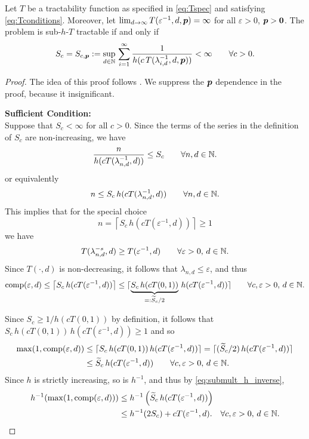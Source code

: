 \documentclass[11pt,a4paper]{article}
\begin{document}
\begin{theorem}\label{thm:subhT}
	Let $T$ be a tractability function as specified in \eqref{eq:Tspec} and satisfying \eqref{eq:Tconditions}.  Moreover, let $\lim_{d \to \infty} T(\varepsilon^{-1},d,\boldsymbol{p}) = \infty$ for all $\varepsilon > 0$, $\boldsymbol{p} > \boldsymbol{0}$.  The problem is sub-$h$-$T$ tractable if and only if
	\[
	S_c = S_{c,\boldsymbol{p}} :=\sup_{d\in\mathbb{N}}  \, \sum_{i=1}^\infty \frac1{h(c\, T(\lambda_{i,d}^{-1},d,\boldsymbol{p}))} <\infty \qquad \forall c > 0.
	\]
\end{theorem}
\begin{proof}
The idea of this proof follows \cite{WW17}.
We suppress the $\boldsymbol{p}$ dependence in the proof, because it insignificant.

\bigskip

\noindent \textbf{Sufficient Condition:}\\
Suppose that $S_c <\infty$ for all $c>0$.  Since the terms of the series in the definition of $S_c$ are non-increasing, we have
	\[
		\frac{n}{h(cT(\lambda_{n,d}^{-1},d))}\le S_c \qquad \forall n,d \in \mathbb{N}.
	\]
or equivalently
\[
	n\le S_c \, h(cT(\lambda_{n,d}^{-1},d))   \qquad \forall n,d \in \mathbb{N}.
\]
This implies that for the special choice
\[
	n = \left\lceil
	S_c \, h(cT(\varepsilon^{-1},d))
	\right\rceil \ge 1
\]
	we have
	\[
	T(\lambda_{n,d}^{-s},d) \ge T(\varepsilon^{-1},d) \qquad \forall \varepsilon > 0, \, d \in \mathbb{N}.
	\]
Since $T(\cdot,d)$ is non-decreasing, it follows that $\lambda_{n,d} \le \varepsilon$, and thus
\[
\operatorname{comp}(\varepsilon,d) \le  \left\lceil
S_c \, h(cT(\varepsilon^{-1},d))
\right\rceil \le   \lceil \underbrace{
S_c \, h(cT(0,1))}_{=: \widetilde{S}_c/2} \, h(cT(\varepsilon^{-1},d))
\rceil\qquad \forall c, \varepsilon > 0, \, d \in \mathbb{N}.
\]

Since $S_c \ge 1/h(cT(0,1))$ by definition, it follows that $S_c \, h(cT(0,1)) \, h(cT(\varepsilon^{-1},d))  \ge 1$ and so
\begin{align*}
\max(1,\operatorname{comp}(\varepsilon,d))
& \le  \lceil  S_c \, h(cT(0,1)) \, h(cT(\varepsilon^{-1},d))   \rceil
 =  \lceil
(\widetilde{S}_c/2) \, h(cT(\varepsilon^{-1},d))
\rceil \\
& \le   \widetilde{S}_c \, h(cT(\varepsilon^{-1},d))
\qquad\forall c, \varepsilon > 0, \, d \in \mathbb{N}.
\end{align*}
Since $h$ is strictly increasing, so is $h^{-1}$, and thus by \eqref{eq:submult_h_inverse}, 
\begin{align*}
h^{-1}(\max(1,\operatorname{comp}(\varepsilon,d)) ) & \le  h^{-1} \left(
\widetilde{S}_c \, h(cT(\varepsilon^{-1},d))  \right)
\\
&  \le  h^{-1} (2 S_c) + cT (\varepsilon^{-1},d).
\quad \forall c, \varepsilon > 0, \, d \in \mathbb{N}.
\end{align*}


\end{proof}
\end{document}
